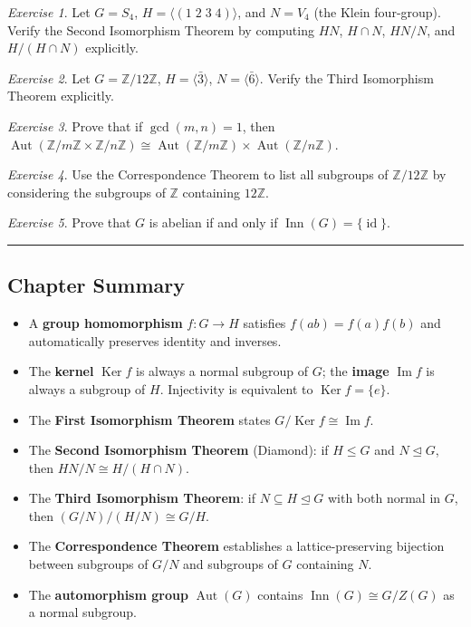 \documentclass[12pt,a4paper,openany]{book}
\theoremstyle{definition}
\theoremstyle{remark}
\newtheorem{exercise}{Exercise}[chapter]
\newcommand{\Z}{\mathbb{Z}}
\DeclareMathOperator{\Aut}{Aut}
\DeclareMathOperator{\Inn}{Inn}
\DeclareMathOperator{\Ker}{Ker}
\DeclareMathOperator{\im}{Im}
\DeclareMathOperator{\id}{id}
\renewcommand{\gcd}{\operatorname{gcd}}
\begin{document}
\begin{exercise}\label{exo:second-iso-application}
Let $G=S_4$, $H=\langle (1\;2\;3\;4)\rangle$, and $N=V_4$
(the Klein four-group).  Verify the Second Isomorphism Theorem
by computing $HN$, $H\cap N$, $HN/N$, and $H/(H\cap N)$ explicitly.
\end{exercise}

\begin{exercise}\label{exo:third-iso-application}
Let $G=\Z/12\Z$, $H=\langle\bar{3}\rangle$, $N=\langle\bar{6}\rangle$.
Verify the Third Isomorphism Theorem explicitly.
\end{exercise}

\begin{exercise}\label{exo:aut-product}
Prove that if $\gcd(m,n)=1$, then
$\Aut(\Z/m\Z\times\Z/n\Z)\cong\Aut(\Z/m\Z)\times\Aut(\Z/n\Z)$.
\end{exercise}

\begin{exercise}\label{exo:correspondence-subgroups}
Use the Correspondence Theorem to list all subgroups of $\Z/12\Z$
by considering the subgroups of $\Z$ containing $12\Z$.
\end{exercise}

\begin{exercise}\label{exo:inn-abelian}
Prove that $G$ is abelian if and only if $\Inn(G)=\{\id\}$.
\end{exercise}

\bigskip
\begin{center}\rule{0.5\textwidth}{0.4pt}\end{center}
\subsection*{Chapter Summary}

\begin{itemize}
\item A \textbf{group homomorphism} $f\colon G\to H$ satisfies
  $f(ab)=f(a)f(b)$ and automatically preserves identity and inverses.
\item The \textbf{kernel} $\Ker f$ is always a normal subgroup of $G$;
  the \textbf{image} $\im f$ is always a subgroup of $H$.
  Injectivity is equivalent to $\Ker f=\{e\}$.
\item The \textbf{First Isomorphism Theorem} states
  $G/\Ker f\cong\im f$.
\item The \textbf{Second Isomorphism Theorem} (Diamond):
  if $H\le G$ and $N\trianglelefteq G$, then $HN/N\cong H/(H\cap N)$.
\item The \textbf{Third Isomorphism Theorem}: if $N\subseteq
  H\trianglelefteq G$ with both normal in $G$, then
  $(G/N)/(H/N)\cong G/H$.
\item The \textbf{Correspondence Theorem} establishes a
  lattice-preserving bijection between subgroups of $G/N$ and
  subgroups of $G$ containing $N$.
\item The \textbf{automorphism group} $\Aut(G)$ contains
  $\Inn(G)\cong G/Z(G)$ as a normal subgroup.
\end{itemize}
\end{document}
